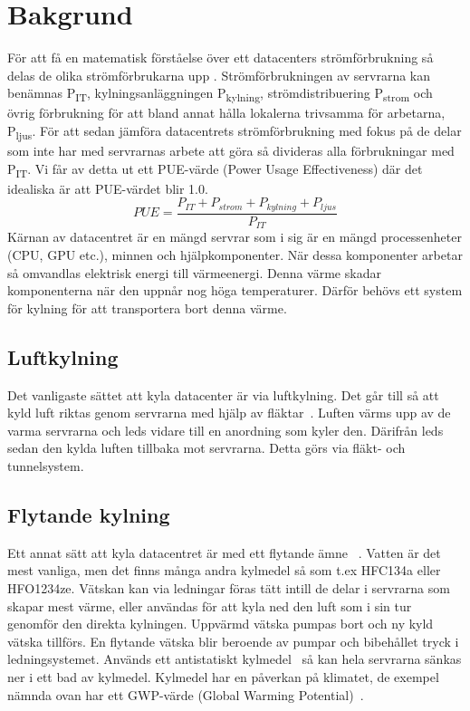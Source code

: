 \documentclass[conference,a4paper]{IEEEtran}
\begin{document}
\section{Bakgrund}
För att få en matematisk förståelse över ett datacenters strömförbrukning så delas de olika strömförbrukarna upp \cite{modelling2}. Strömförbrukningen 
av servrarna kan benämnas P\textsubscript{IT}, kylningsanläggningen P\textsubscript{kylning}, strömdistribuering P\textsubscript{strom} 
och övrig förbrukning för att bland annat hålla lokalerna trivsamma för arbetarna, P\textsubscript{ljus}. För att sedan jämföra datacentrets strömförbrukning med 
fokus på de delar som inte har med servrarnas arbete att göra så divideras alla förbrukningar med P\textsubscript{IT}. Vi får av detta ut ett PUE-värde 
(Power Usage Effectiveness) där det idealiska är att PUE-värdet blir 1.0.
\begin{equation}
    PUE = \frac{P_{IT} + P_{strom} + P_{kylning} + P_{ljus}}{P_{IT}}    
\end{equation}
Kärnan av datacentret är en mängd servrar som i sig är en mängd processenheter (CPU, GPU etc.), minnen och hjälpkomponenter. 
När dessa komponenter arbetar så omvandlas elektrisk energi till värmeenergi. Denna värme skadar komponenterna när den uppnår nog höga temperaturer. Därför behövs  
ett system för kylning för att transportera bort denna värme.
\subsection{Luftkylning}
Det vanligaste sättet att kyla datacenter är via luftkylning. Det går till så att kyld luft 
riktas genom servrarna med hjälp av fläktar~\cite{modelling2,modelling1}. Luften värms upp av de varma servrarna och leds vidare till en anordning som kyler den. 
Därifrån leds sedan den kylda luften tillbaka mot servrarna. Detta görs via fläkt- och tunnelsystem.
\subsection{Flytande kylning}
Ett annat sätt att kyla datacentret är med ett flytande ämne ~\cite{energycompare2}. Vatten är det mest vanliga, men det finns många andra kylmedel så 
som t.ex HFC134a eller HFO1234ze. Vätskan kan via ledningar föras tätt intill de delar i servrarna som skapar mest värme, eller användas för att kyla ned den 
luft som i sin tur genomför den direkta kylningen. Uppvärmd vätska pumpas bort och ny kyld vätska tillförs. En flytande vätska 
blir beroende av pumpar och bibehållet tryck i ledningsystemet. Används ett antistatiskt kylmedel~\cite{immersioncooling1} så kan hela servrarna sänkas ner i ett 
bad av kylmedel. Kylmedel har en påverkan på klimatet, de exempel nämnda ovan har ett GWP-värde (Global Warming Potential)~\cite{GWP}.
\end{document}
